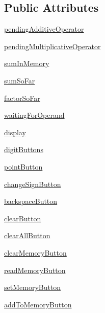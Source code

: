 \subsection*{Public Attributes}
\begin{DoxyCompactItemize}
\item 
\hyperlink{classcalculator_1_1Calculator_aad2e1f38ac71d003034812c65df373c2}{pending\+Additive\+Operator}
\item 
\hyperlink{classcalculator_1_1Calculator_a55597150b19df2b330d080dafda4c5d2}{pending\+Multiplicative\+Operator}
\item 
\hyperlink{classcalculator_1_1Calculator_abb765b5d8adbd919a74f5f2c3b195ff3}{sum\+In\+Memory}
\item 
\hyperlink{classcalculator_1_1Calculator_a50d1f5f6520fd0dd45f3364698d57cbe}{sum\+So\+Far}
\item 
\hyperlink{classcalculator_1_1Calculator_a6209fea983e91b146d7ca74a42827ce5}{factor\+So\+Far}
\item 
\hyperlink{classcalculator_1_1Calculator_a82e6d682035973f2120d60af0debf837}{waiting\+For\+Operand}
\item 
\hyperlink{classcalculator_1_1Calculator_a2bd0ea2bdcc8052a391ae7fdda93bc02}{display}
\item 
\hyperlink{classcalculator_1_1Calculator_a0af3ab12ffc78602c42f9ac69852ba03}{digit\+Buttons}
\item 
\hyperlink{classcalculator_1_1Calculator_a45779e6d17b4982e7af7d8deec3a4375}{point\+Button}
\item 
\hyperlink{classcalculator_1_1Calculator_a3608bfe107a0a81b0932d638c4afed77}{change\+Sign\+Button}
\item 
\hyperlink{classcalculator_1_1Calculator_aa96e178297eba19abd0bd794a9061270}{backspace\+Button}
\item 
\hyperlink{classcalculator_1_1Calculator_a8566c0b6d0ec7e488ffdb1923bad37d9}{clear\+Button}
\item 
\hyperlink{classcalculator_1_1Calculator_a4779c6fdcfcbe200045782d3ca21761b}{clear\+All\+Button}
\item 
\hyperlink{classcalculator_1_1Calculator_a9f4956ce4bfbc2b68d24480efb6ca682}{clear\+Memory\+Button}
\item 
\hyperlink{classcalculator_1_1Calculator_a9edf39c1db9808894e01b613770a70c9}{read\+Memory\+Button}
\item 
\hyperlink{classcalculator_1_1Calculator_aad2c45248db9ba41126d41256de41661}{set\+Memory\+Button}
\item 
\hyperlink{classcalculator_1_1Calculator_a4764171efdb4624e38fb5dc258153f14}{add\+To\+Memory\+Button}

\end{DoxyCompactItemize}
